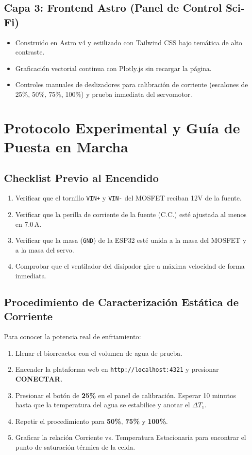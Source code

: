 \documentclass[11pt,letterpaper]{article}
\begin{document}
\subsection{Capa 3: Frontend Astro (Panel de Control Sci-Fi)}
\begin{itemize}
    \item Construido en Astro v4 y estilizado con Tailwind CSS bajo temática de alto contraste.
    \item Graficación vectorial continua con Plotly.js sin recargar la página.
    \item Controles manuales de deslizadores para calibración de corriente (escalones de 25\%, 50\%, 75\%, 100\%) y prueba inmediata del servomotor.
\end{itemize}

\section{Protocolo Experimental y Guía de Puesta en Marcha}

\subsection{Checklist Previo al Encendido}
\begin{enumerate}
    \item Verificar que el tornillo \texttt{VIN+} y \texttt{VIN-} del MOSFET reciban 12V de la fuente.
    \item Verificar que la perilla de corriente de la fuente (C.C.) esté ajustada al menos en $7.0\,\text{A}$.
    \item Verificar que la masa (\texttt{GND}) de la ESP32 esté unida a la masa del MOSFET y a la masa del servo.
    \item Comprobar que el ventilador del disipador gire a máxima velocidad de forma inmediata.
\end{enumerate}

\subsection{Procedimiento de Caracterización Estática de Corriente}
Para conocer la potencia real de enfriamiento:
\begin{enumerate}
    \item Llenar el biorreactor con el volumen de agua de prueba.
    \item Encender la plataforma web en \texttt{http://localhost:4321} y presionar \textbf{CONECTAR}.
    \item Presionar el botón de \textbf{25\%} en el panel de calibración. Esperar 10 minutos hasta que la temperatura del agua se estabilice y anotar el $\Delta T_1$.
    \item Repetir el procedimiento para \textbf{50\%}, \textbf{75\%} y \textbf{100\%}.
    \item Graficar la relación Corriente vs. Temperatura Estacionaria para encontrar el punto de saturación térmica de la celda.
\end{enumerate}
\end{document}
